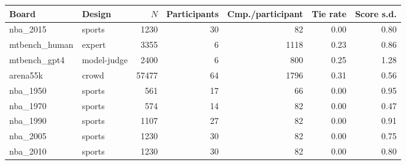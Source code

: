 {\footnotesize\setlength{\tabcolsep}{3pt}
\begin{tabular}{llrrrrr}
\toprule
Board & Design & $N$ & Participants & Cmp./participant & Tie rate & Score s.d. \\
\midrule
nba\_2015 & sports & 1230 & 30 & 82 & 0.00 & 0.80 \\
mtbench\_human & expert & 3355 & 6 & 1118 & 0.23 & 0.86 \\
mtbench\_gpt4 & model-judge & 2400 & 6 & 800 & 0.25 & 1.28 \\
arena55k & crowd & 57477 & 64 & 1796 & 0.31 & 0.56 \\
nba\_1950 & sports & 561 & 17 & 66 & 0.00 & 0.95 \\
nba\_1970 & sports & 574 & 14 & 82 & 0.00 & 0.47 \\
nba\_1990 & sports & 1107 & 27 & 82 & 0.00 & 0.91 \\
nba\_2005 & sports & 1230 & 30 & 82 & 0.00 & 0.75 \\
nba\_2010 & sports & 1230 & 30 & 82 & 0.00 & 0.80 \\
\bottomrule
\end{tabular}
}
